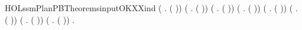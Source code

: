 \begin{SaveVerbatim}{HOLssmPlanPBTheoremsinputOKXXind}
     (\HOLSymConst{\HOLTokenForall{}}  .  (   )) \HOLSymConst{\HOLTokenConj{}}
     (\HOLSymConst{\HOLTokenForall{}} .  (  )) \HOLSymConst{\HOLTokenConj{}}
     (\HOLSymConst{\HOLTokenForall{}} .  (  )) \HOLSymConst{\HOLTokenConj{}}
     (\HOLSymConst{\HOLTokenForall{}} .  (  )) \HOLSymConst{\HOLTokenConj{}}
     (\HOLSymConst{\HOLTokenForall{}} .  (  )) \HOLSymConst{\HOLTokenConj{}} (\HOLSymConst{\HOLTokenForall{}} .  (  )) \HOLSymConst{\HOLTokenConj{}}
     (\HOLSymConst{\HOLTokenForall{}} .  (  )) \HOLSymConst{\HOLTokenConj{}} (\HOLSymConst{\HOLTokenForall{}} .  (  )) \HOLSymConst{\HOLTokenImp{}}
     \HOLSymConst{\HOLTokenForall{}}.  
\end{SaveVerbatim}
\newcommand{\HOLssmPlanPBTheoremsinputOKXXind}{\UseVerbatim{HOLssmPlanPBTheoremsinputOKXXind}}
